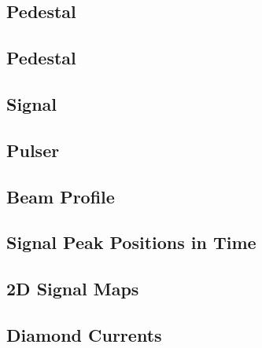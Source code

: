 \documentclass[9pt]{beamer}
\begin{document}
\subsection{Pedestal}
\begin{frame}
\end{frame}
\subsection{Pedestal}
\begin{frame}
\end{frame}
\subsection{Signal}
\begin{frame}
\end{frame}
\subsection{Pulser}
\begin{frame}
\end{frame}
\subsection{Beam Profile}
\begin{frame}
\end{frame}
\subsection{Signal Peak Positions in Time}
\begin{frame}
\end{frame}
\subsection{2D Signal Maps}
\begin{frame}
\end{frame}
\subsection{Diamond Currents}
\begin{frame}
\end{frame}

\end{document}
